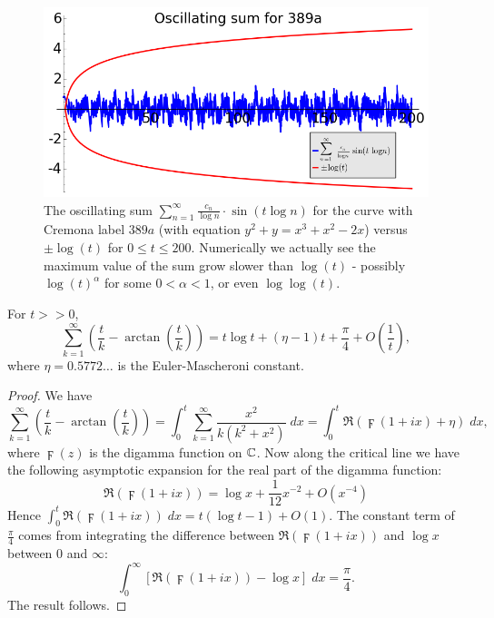 \documentclass[10pt]{article}
\begin{document}
\begin{figure}[!h]
    \centering
    \includegraphics[width=1.0\textwidth]{graphics/M_E_trig_sum_bounds.png}
    \caption{The oscillating sum $\sum_{n=1}^{\infty} \frac{c_n}{\log n}\cdot \sin(t\log n)$ for the curve with Cremona label $389a$ (with equation $y^2 + y = x^3 + x^2 - 2x$) versus $\pm \log(t)$ for $0\le t \le 200$. Numerically we actually see the maximum value of the sum grow slower than $\log(t)$ - possibly $\log(t)^{\alpha}$ for some $0<\alpha<1$, or even $\log\log(t)$.}
    \label{fig:M_E_trig_sum_bounds}
\end{figure}

\begin{lemma}\label{lem:arctan_sum_size}
For $t >> 0$, 
\begin{equation}
\sum_{k=1}^{\infty} \left(\frac{t}{k} - \arctan\left(\frac{t}{k}\right)\right) = t\log t + (\eta-1)t + \frac{\pi}{4} + O\left(\frac{1}{t}\right),
\end{equation}
where $\eta = 0.5772\ldots$ is the Euler-Mascheroni constant.
\end{lemma}
\begin{proof}
We have
\begin{equation*}
\sum_{k=1}^{\infty} \left(\frac{t}{k} - \arctan\left(\frac{t}{k}\right)\right) = \int_{0}^{t} \sum_{k=1}^{\infty} \frac{x^2}{k(k^2+x^2)} \; dx = \int_{0}^{t} \Re\left(\digamma(1+ix) + \eta\right) \; dx,
\end{equation*}
where $\digamma(z)$ is the digamma function on $\mathbb{C}$. Now along the critical line we have the following asymptotic expansion for the real part of the digamma function:
\begin{equation}
\Re\left(\digamma(1+ix)\right) = \log x + \frac{1}{12} x^{-2} + O(x^{-4})
\end{equation}
Hence $\int_{0}^{t} \Re\left(\digamma(1+ix)\right) \; dx = t(\log t - 1)  + O(1)$. The constant term of $\frac{\pi}{4}$ comes from integrating the difference between $\Re\left(\digamma(1+ix)\right)$ and $\log x$ between $0$ and $\infty$:
\begin{equation*}
\int_{0}^{\infty} \left[\Re\left(\digamma(1+ix)\right) - \log x\right] \; dx = \frac{\pi}{4}.
\end{equation*}
The result follows.
\end{proof}
\end{document}
